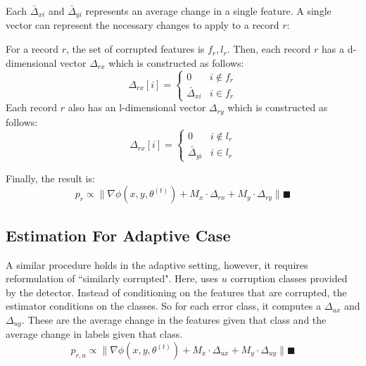 Each $\bar{\Delta}_{xi}$ and $\bar{\Delta}_{yi}$ represents an average change in a single feature.
A single vector can represent the necessary changes to apply to a record $r$:
\begin{lemma}
For a record $r$, the set of corrupted features is $f_r,l_r$.
Then, each record $r$ has a d-dimensional vector $\Delta_{rx}$ which is constructed as follows:
\[
 \Delta_{rx}[i] = \begin{cases} 0 & i \notin f_r \\ 
\bar{\Delta}_{xi} & i \in f_r
\end{cases} 
\]
Each record $r$ also has an l-dimensional vector $\Delta_{ry}$ which is constructed as follows:
\[
 \Delta_{rx}[i] = \begin{cases} 0 & i \notin l_r \\ 
\bar{\Delta}_{yi} & i \in l_r
\end{cases} 
\]
\end{lemma}

Finally, the result is: 
\[p_{r}\propto\|\nabla\phi(x,y,\theta^{(t)}) + M_x \cdot \Delta_{rx} +  M_y \cdot \Delta_{ry}\|
\blacksquare
\]

\subsection{Estimation For Adaptive Case}
A similar procedure holds in the adaptive setting, however, it requires reformulation of ``similarly corrupted".
Here, \sys uses $u$ corruption classes provided by the detector.
Instead of conditioning on the features that are corrupted, the estimator conditions on the classes.
So for each error class, it computes a $\Delta_{ux}$ and $\Delta_{uy}$.
These are the average change in the features given that class and the average change in labels given that class.
\[
p_{r,u}\propto\|\nabla\phi(x,y,\theta^{(t)}) + M_x \cdot \Delta_{ux} +  M_y \cdot \Delta_{uy}\|
\blacksquare
\] 

